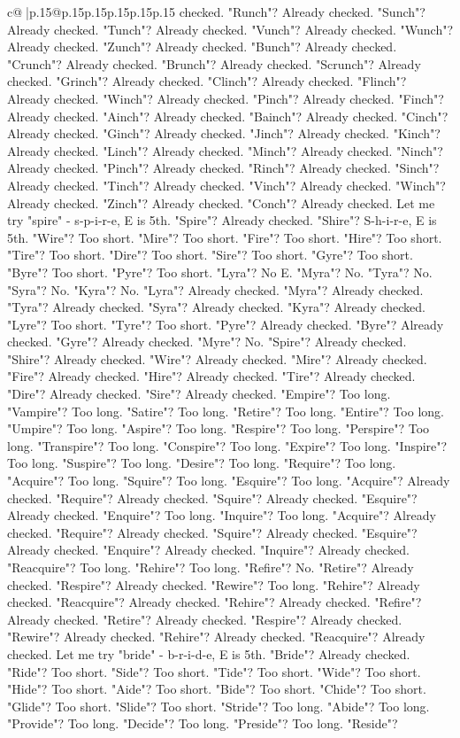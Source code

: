 \documentclass{article}
\begin{document}
{\begin{supertabular}{c@{$\;$}|p{.15\linewidth}@{}p{.15\linewidth}p{.15\linewidth}p{.15\linewidth}p{.15\linewidth}p{.15\linewidth}}
{{{checked. "Runch"? Already checked. "Sunch"? Already checked. "Tunch"? Already checked. "Vunch"? Already checked. "Wunch"? Already checked. "Zunch"? Already checked. "Bunch"? Already checked. "Crunch"? Already checked. "Brunch"? Already checked. "Scrunch"? Already checked. "Grinch"? Already checked. "Clinch"? Already checked. "Flinch"? Already checked. "Winch"? Already checked. "Pinch"? Already checked. "Finch"? Already checked. "Ainch"? Already checked. "Bainch"? Already checked. "Cinch"? Already checked. "Ginch"? Already checked. "Jinch"? Already checked. "Kinch"? Already checked. "Linch"? Already checked. "Minch"? Already checked. "Ninch"? Already checked. "Pinch"? Already checked. "Rinch"? Already checked. "Sinch"? Already checked. "Tinch"? Already checked. "Vinch"? Already checked. "Winch"? Already checked. "Zinch"? Already checked. "Conch"? Already checked. Let me try "spire" {-} s{-}p{-}i{-}r{-}e, E is 5th. "Spire"? Already checked. "Shire"? S{-}h{-}i{-}r{-}e, E is 5th. "Wire"? Too short. "Mire"? Too short. "Fire"? Too short. "Hire"? Too short. "Tire"? Too short. "Dire"? Too short. "Sire"? Too short. "Gyre"? Too short. "Byre"? Too short. "Pyre"? Too short. "Lyra"? No E. "Myra"? No. "Tyra"? No. "Syra"? No. "Kyra"? No. "Lyra"? Already checked. "Myra"? Already checked. "Tyra"? Already checked. "Syra"? Already checked. "Kyra"? Already checked. "Lyre"? Too short. "Tyre"? Too short. "Pyre"? Already checked. "Byre"? Already checked. "Gyre"? Already checked. "Myre"? No. "Spire"? Already checked. "Shire"? Already checked. "Wire"? Already checked. "Mire"? Already checked. "Fire"? Already checked. "Hire"? Already checked. "Tire"? Already checked. "Dire"? Already checked. "Sire"? Already checked. "Empire"? Too long. "Vampire"? Too long. "Satire"? Too long. "Retire"? Too long. "Entire"? Too long. "Umpire"? Too long. "Aspire"? Too long. "Respire"? Too long. "Perspire"? Too long. "Transpire"? Too long. "Conspire"? Too long. "Expire"? Too long. "Inspire"? Too long. "Suspire"? Too long. "Desire"? Too long. "Require"? Too long. "Acquire"? Too long. "Squire"? Too long. "Esquire"? Too long. "Acquire"? Already checked. "Require"? Already checked. "Squire"? Already checked. "Esquire"? Already checked. "Enquire"? Too long. "Inquire"? Too long. "Acquire"? Already checked. "Require"? Already checked. "Squire"? Already checked. "Esquire"? Already checked. "Enquire"? Already checked. "Inquire"? Already checked. "Reacquire"? Too long. "Rehire"? Too long. "Refire"? No. "Retire"? Already checked. "Respire"? Already checked. "Rewire"? Too long. "Rehire"? Already checked. "Reacquire"? Already checked. "Rehire"? Already checked. "Refire"? Already checked. "Retire"? Already checked. "Respire"? Already checked. "Rewire"? Already checked. "Rehire"? Already checked. "Reacquire"? Already checked. Let me try "bride" {-} b{-}r{-}i{-}d{-}e, E is 5th. "Bride"? Already checked. "Ride"? Too short. "Side"? Too short. "Tide"? Too short. "Wide"? Too short. "Hide"? Too short. "Aide"? Too short. "Bide"? Too short. "Chide"? Too short. "Glide"? Too short. "Slide"? Too short. "Stride"? Too long. "Abide"? Too long. "Provide"? Too long. "Decide"? Too long. "Preside"? Too long. "Reside"? }}}
\end{supertabular}}
\end{document}

